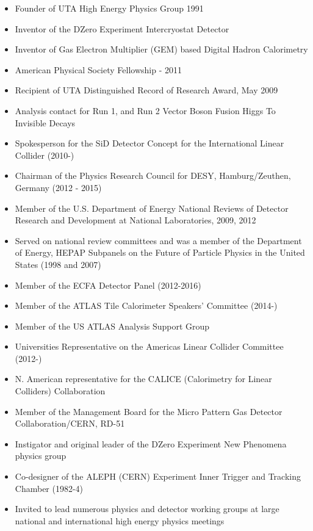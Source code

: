 
\vspace*{0.1in}
\begin{itemize}[noitemsep,nolistsep]

\item{Founder of UTA High Energy Physics Group 1991}
\item{Inventor of the DZero Experiment Intercryostat Detector}
\item{Inventor of Gas Electron Multiplier (GEM) based Digital Hadron Calorimetry}
\item{American Physical Society Fellowship - 2011}
\item{Recipient of UTA Distinguished Record of Research Award, May 2009}
\item{Analysis contact for Run 1, and Run 2 Vector Boson Fusion Higgs To Invisible Decays}
\item{Spokesperson for the SiD Detector Concept for the International Linear Collider (2010-)}
\item{Chairman of the Physics Research Council for DESY, Hamburg/Zeuthen, Germany (2012 - 2015)}
\item{Member of the U.S. Department of Energy National Reviews of Detector Research and Development at National Laboratories, 2009, 2012}
\item{Served on national review committees and was a member of the Department of Energy, HEPAP Subpanels on the Future of Particle Physics in the United States (1998 and 2007)}
\item{Member of the ECFA Detector Panel (2012-2016)}
\item{Member of the ATLAS Tile Calorimeter Speakers' Committee (2014-) }
\item{Member of the US ATLAS Analysis Support Group}
\item{Universities Representative on the Americas Linear Collider Committee (2012-) }
\item{N. American representative for the CALICE (Calorimetry for Linear Colliders) Collaboration}
\item{Member of the Management Board for the Micro Pattern Gas Detector Collaboration/CERN, RD-51}
\item{Instigator and original leader of the DZero Experiment New Phenomena physics group}
\item{Co-designer of the ALEPH (CERN) Experiment Inner Trigger and Tracking Chamber (1982-4)}
\item{Invited to lead numerous physics and detector working groups at large national and international high energy physics meetings}

\end{itemize}

